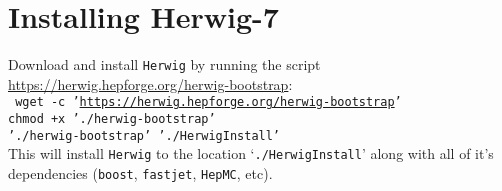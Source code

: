 \section{Installing Herwig-7}

Download and install {\tt Herwig} by running the script \url{https://herwig.hepforge.org/herwig-bootstrap}:\\
{\tt
wget -c '\url{https://herwig.hepforge.org/herwig-bootstrap}'\\
chmod +x './herwig-bootstrap'\\
'./herwig-bootstrap' './HerwigInstall'
}\\
This will install {\tt Herwig} to the location `{\tt ./HerwigInstall}' along with all of it's dependencies ({\tt boost}, {\tt fastjet}, {\tt HepMC}, etc).